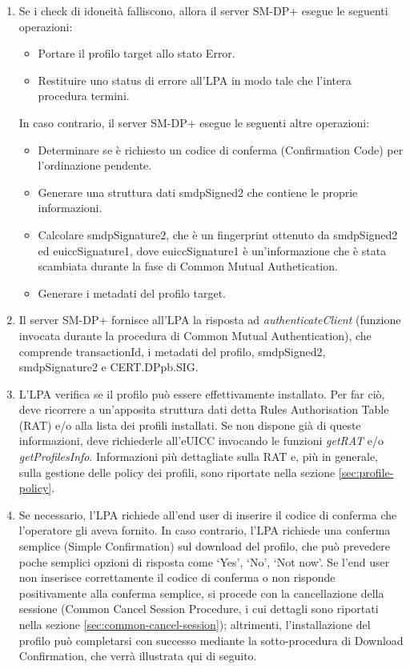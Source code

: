 \documentclass[10pt, oneside]{book}
\begin{document}
\begin{enumerate}
\item Se i check di idoneità falliscono, allora il server SM-DP+ esegue le seguenti operazioni:
\begin{itemize}[itemsep=0pt]
\item Portare il profilo target allo stato Error.
\item Restituire uno status di errore all'LPA in modo tale che l'intera procedura termini.
\end{itemize}
In caso contrario, il server SM-DP+ esegue le seguenti altre operazioni:
\begin{itemize}[itemsep=0pt]
\item Determinare se è richiesto un codice di conferma (Confirmation Code) per l'ordinazione pendente.
\item Generare una struttura dati smdpSigned2 che contiene le proprie informazioni.
\item Calcolare smdpSignature2, che è un fingerprint ottenuto da smdpSigned2 ed euiccSignature1, dove euiccSignature1 è un'informazione che è stata scambiata durante la fase di Common Mutual Authetication.
\item Generare i metadati del profilo target.
\end{itemize}
\item Il server SM-DP+ fornisce all'LPA la risposta ad \textit{authenticateClient} (funzione invocata durante la procedura di Common Mutual Authentication), che comprende transactionId, i metadati del profilo, smdpSigned2, smdpSignature2 e CERT.DPpb.SIG.
\item L'LPA verifica se il profilo può essere effettivamente installato. Per far ciò, deve ricorrere a un'apposita struttura dati detta Rules Authorisation Table (RAT) e/o alla lista dei profili installati. Se non dispone già di queste informazioni, deve richiederle all'eUICC invocando le funzioni \textit{getRAT} e/o \textit{getProfilesInfo}. Informazioni più dettagliate sulla RAT e, più in generale, sulla gestione delle policy dei profili, sono riportate nella sezione \ref{sec:profile-policy}.
\item Se necessario, l'LPA richiede all'end user di inserire il codice di conferma che l'operatore gli aveva fornito. In caso contrario, l'LPA richiede una conferma semplice (Simple Confirmation) sul download del profilo, che può prevedere poche semplici opzioni di risposta come `Yes', `No', `Not now'. Se l'end user non inserisce correttamente il codice di conferma o non risponde positivamente alla conferma semplice, si procede con la cancellazione della sessione (Common Cancel Session Procedure, i cui dettagli sono riportati nella sezione \ref{sec:common-cancel-session}); altrimenti, l'installazione del profilo può completarsi con successo mediante la sotto-procedura di Download Confirmation, che verrà illustrata qui di seguito.
\end{enumerate}
\end{document}
